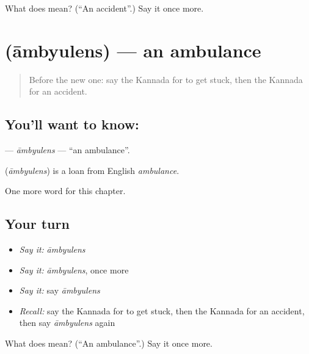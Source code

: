 \begin{tcolorbox}[breakable,colback=teal!4,colframe=teal!35!black,title={Before you move on}]
What does  mean? (\textquotedblleft{}An accident\textquotedblright{}.) Say it once more.
\end{tcolorbox}
\section[\texorpdfstring{\kn{ಆಂಬ್ಯುಲೆನ್ಸ್} (āmbyulens)}{ಆಂಬ್ಯುಲೆನ್ಸ್ (āmbyulens)}]{ (āmbyulens) — an ambulance}

\label{lesson:KA-C282-ambyulens}



\begin{quote}
Before the new one: say the Kannada for to get stuck, then the Kannada for an accident.
\end{quote}

\subsection*{You'll want to know: }
\textbf{} — \emph{āmbyulens} — \textquotedblleft{}an ambulance\textquotedblright{}.

\begin{cousinweb}
\textbf{} (\emph{āmbyulens}) is a loan from English \emph{ambulance}.
\end{cousinweb}

\begin{grammarlens}[title={What you've built}]
One more word for this chapter.
\end{grammarlens}

\subsection*{Your turn}
\begin{itemize}
\raggedright
  \item \emph{Say it:} \emph{āmbyulens}
  \item \emph{Say it:} \emph{āmbyulens}, once more
  \item \emph{Say it:} say \emph{āmbyulens}
  \item \emph{Recall:} say the Kannada for to get stuck, then the Kannada for an accident, then say \emph{āmbyulens} again
\end{itemize}

\begin{tcolorbox}[breakable,colback=teal!4,colframe=teal!35!black,title={Before you move on}]
What does  mean? (\textquotedblleft{}An ambulance\textquotedblright{}.) Say it once more.
\end{tcolorbox}
